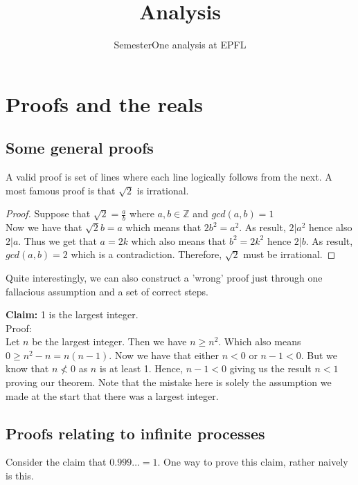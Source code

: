 \documentclass{article}
\title{Analysis}
\author{SemesterOne analysis at EPFL}
\date{\vspace{-5ex}}
\numberwithin{equation}{subsection}
\begin{document}
\maketitle

\section{Proofs and the reals}
\subsection{Some general proofs}
A valid proof is set of lines where each line logically follows from the next. 
A most famous proof is that $\sqrt{2} $ is irrational. 

\begin{tcolorbox}
\begin{proof}
	Suppose that $\sqrt{2} = \frac{a}{b}$ where $a,b \in \mathbb{Z}$ and $gcd(a,b) = 1$
	\\
	Now we have that $\sqrt{2}b = a$ which means that $2b^2 = a^2$.
	As result, $2 \vert a^2$ hence also $2 \vert a$. Thus we get that $a = 2k$ which also means that $b^2 = 2k^2$ hence $2 \vert b$. As result, $gcd(a,b) = 2$ which is a contradiction. Therefore, $\sqrt{2}$ must be irrational. 
	\end{proof}
\end{tcolorbox}

Quite interestingly, we can also construct a 'wrong' proof just through one fallacious assumption and a set of correct steps. 

\begin{tcolorbox}
    \textbf{Claim:} 1 is the largest integer.
    \\
    Proof: 
    \\
    Let $n$ be the largest integer. Then we have $n \geq n^2$. Which also means $0 \geq n^2 - n = n(n-1)$. Now we have that either $n < 0$ or $n - 1 < 0$. But we know that $ n \nless 0$ as $n$ is at least 1. Hence, $n - 1 < 0$ giving us the result $n < 1$ proving our theorem. Note that the mistake here is solely the assumption we made at the start that there was a largest integer. 
\end{tcolorbox}
\subsection{Proofs relating to infinite processes}
Consider the claim that $0.999\ldots = 1$.
One way to prove this claim, rather naively is this.
\end{document}
